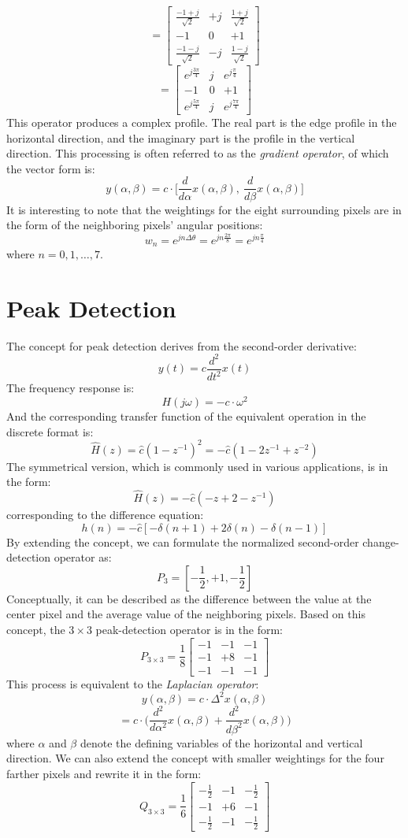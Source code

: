 \documentclass{article}
\begin{document}
\[
=
\begin{bmatrix}
\frac{-1+j}{\sqrt2}&+j&\frac{1+j}{\sqrt2}\\
-1&0&+1\\
\frac{-1-j}{\sqrt2}&-j&\frac{1-j}{\sqrt2}
\end{bmatrix}
\]
\[
=
\begin{bmatrix}
e^{j\frac{3\pi}{4}}&j&e^{j\frac{\pi}{4}}\\
-1&0&+1\\
e^{j\frac{5\pi}{4}}&j&e^{j\frac{7\pi}{4}}
\end{bmatrix}
\]
This operator produces a complex profile. The real part is the edge profile in the horizontal direction, and the imaginary part is the profile in the vertical direction. This processing is often referred to as the \textit{gradient operator}, of which the vector form is:
\[
y(\alpha,\beta)=c\cdot\bigg[\frac{d}{d\alpha}x(\alpha,\beta),\ \frac{d}{d\beta}x(\alpha,\beta)\bigg]
\]
It is interesting to note that the weightings for the eight surrounding pixels are in the form of the neighboring pixels' angular positions:
\[
w_n=e^{jn\Delta\theta}=e^{jn\frac{2\pi}{8}}=e^{jn\frac{\pi}{4}}
\]
where \(n=0,1,\dots,7\).

\section{Peak Detection}
The concept for peak detection derives from the second-order derivative:
\[
y(t)=c\frac{d^2}{dt^2}x(t)
\]
The frequency response is:
\[
H(j\omega)=-c\cdot\omega^2
\]
And the corresponding transfer function of the equivalent operation in the discrete format is:
\[
\hat{H}(z)=\hat{c}(1-z^{-1})^2=-\hat{c}(1-2z^{-1}+z^{-2})
\]
The symmetrical version, which is commonly used in various applications, is in the form:
\[
\hat{H}(z)=-\hat{c}(-z+2-z^{-1})
\]
corresponding to the difference equation:
\[
h(n)=-\hat{c}[-\delta(n+1)+2\delta(n)-\delta(n-1)]
\]
By extending the concept, we can formulate the normalized second-order change-detection operator as:
\[
P_3=[-\frac{1}{2},+1,-\frac{1}{2}]
\]
Conceptually, it can be described as the difference between the value at the center pixel and the average value of the neighboring pixels. Based on this concept, the \(3\times3\) peak-detection operator is in the form:
\[
P_{3\times3}=\frac{1}{8}
\begin{bmatrix}
-1&-1&-1\\
-1&+8&-1\\
-1&-1&-1
\end{bmatrix}
\]
This process is equivalent to the \textit{Laplacian operator}:
\[
y(\alpha,\beta)=c\cdot\Delta^2x(\alpha,\beta)
\]
\[
=c\cdot\bigg(\frac{d^2}{d\alpha^2}x(\alpha,\beta)+\frac{d^2}{d\beta^2}x(\alpha,\beta)\bigg)
\]
where \(\alpha\) and \(\beta\) denote the defining variables of the horizontal and vertical direction. We can also extend the concept with smaller weightings for the four farther pixels and rewrite it in the form:
\[
Q_{3\times3}=\frac{1}{6}
\begin{bmatrix}
-\frac{1}{2}&-1&-\frac{1}{2}\\
-1&+6&-1\\
-\frac{1}{2}&-1&-\frac{1}{2}
\end{bmatrix}
\]
\end{document}
